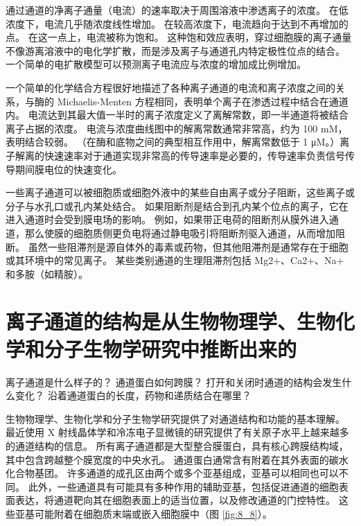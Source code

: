 通过通道的净离子通量（电流）的速率取决于周围溶液中渗透离子的浓度。 
在低浓度下，电流几乎随浓度线性增加。 
在较高浓度下，电流趋向于达到不再增加的点。 
在这一点上，电流被称为饱和。 
这种饱和效应表明，穿过细胞膜的离子通量不像游离溶液中的电化学扩散，而是涉及离子与通道孔内特定极性位点的结合。 
一个简单的电扩散模型可以预测离子电流应与浓度的增加成比例增加。


一个简单的化学结合方程很好地描述了各种离子通道的电流和离子浓度之间的关系，与酶的 Michaelis-Menten 方程相同，表明单个离子在渗透过程中结合在通道内。 
电流达到其最大值一半时的离子浓度定义了离解常数，即一半通道将被结合离子占据的浓度。 
电流与浓度曲线图中的解离常数通常非常高，约为 100 mM，表明结合较弱。 （在酶和底物之间的典型相互作用中，解离常数低于 1 μM。）离子解离的快速速率对于通道实现非常高的传导速率是必要的，传导速率负责信号传导期间膜电位的快速变化。


一些离子通道可以被细胞质或细胞外液中的某些自由离子或分子阻断，这些离子或分子与水孔口或孔内某处结合。 如果阻断剂是结合到孔内某个位点的离子，它在进入通道时会受到膜电场的影响。 
例如，如果带正电荷的阻断剂从膜外进入通道，那么使膜的细胞质侧更负电将通过静电吸引将阻断剂驱入通道，从而增加阻断。 
虽然一些阻滞剂是源自体外的毒素或药物，但其他阻滞剂是通常存在于细胞或其环境中的常见离子。 
某些类别通道的生理阻滞剂包括 Mg2+、Ca2+、Na+ 和多胺（如精胺）。



\section{离子通道的结构是从生物物理学、生物化学和分子生物学研究中推断出来的}
离子通道是什么样子的？ 
通道蛋白如何跨膜？ 
打开和关闭时通道的结构会发生什么变化？ 
沿着通道蛋白的长度，药物和递质结合在哪里？


生物物理学、生物化学和分子生物学研究提供了对通道结构和功能的基本理解。 
最近使用 X 射线晶体学和冷冻电子显微镜的研究提供了有关原子水平上越来越多的通道结构的信息。 
所有离子通道都是大型整合膜蛋白，具有核心跨膜结构域，其中包含跨越整个膜宽度的中央水孔。 
通道蛋白通常含有附着在其外表面的碳水化合物基团。 许多通道的成孔区由两个或多个亚基组成，亚基可以相同也可以不同。 
此外，一些通道具有可能具有多种作用的辅助亚基，包括促进通道的细胞表面表达，将通道靶向其在细胞表面上的适当位置，以及修改通道的门控特性。 
这些亚基可能附着在细胞质末端或嵌入细胞膜中（图 \ref{fig:8_8}）。

